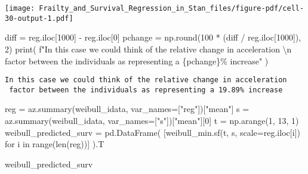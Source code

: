 \documentclass[
  letterpaper,
  DIV=11,
  numbers=noendperiod]{scrartcl}
\newenvironment{Shaded}{\begin{snugshade}}{\end{snugshade}}
\newcommand{\BuiltInTok}[1]{\textcolor[rgb]{0.00,0.23,0.31}{#1}}
\newcommand{\CharTok}[1]{\textcolor[rgb]{0.13,0.47,0.30}{#1}}
\newcommand{\ControlFlowTok}[1]{\textcolor[rgb]{0.00,0.23,0.31}{#1}}
\newcommand{\DecValTok}[1]{\textcolor[rgb]{0.68,0.00,0.00}{#1}}
\newcommand{\KeywordTok}[1]{\textcolor[rgb]{0.00,0.23,0.31}{#1}}
\newcommand{\NormalTok}[1]{\textcolor[rgb]{0.00,0.23,0.31}{#1}}
\newcommand{\OperatorTok}[1]{\textcolor[rgb]{0.37,0.37,0.37}{#1}}
\newcommand{\SpecialCharTok}[1]{\textcolor[rgb]{0.37,0.37,0.37}{#1}}
\newcommand{\SpecialStringTok}[1]{\textcolor[rgb]{0.13,0.47,0.30}{#1}}
\newcommand{\StringTok}[1]{\textcolor[rgb]{0.13,0.47,0.30}{#1}}
\begin{document}
\texttt{[image: Frailty\_and\_Survival\_Regression\_in\_Stan\_files/figure-pdf/cell-30-output-1.pdf]}

\begin{Shaded}
\begin{Highlighting}[]
\NormalTok{diff }\OperatorTok{=}\NormalTok{ reg.iloc[}\DecValTok{1000}\NormalTok{] }\OperatorTok{{-}}\NormalTok{ reg.iloc[}\DecValTok{0}\NormalTok{]}
\NormalTok{pchange }\OperatorTok{=}\NormalTok{ np.}\BuiltInTok{round}\NormalTok{(}\DecValTok{100} \OperatorTok{*}\NormalTok{ (diff }\OperatorTok{/}\NormalTok{ reg.iloc[}\DecValTok{1000}\NormalTok{]), }\DecValTok{2}\NormalTok{)}
\BuiltInTok{print}\NormalTok{(}
    \SpecialStringTok{f"In this case we could think of the relative change in acceleration }\CharTok{\textbackslash{}n}\SpecialStringTok{ factor between the individuals as representing a }\SpecialCharTok{\{}\NormalTok{pchange}\SpecialCharTok{\}}\SpecialStringTok{\% increase"}
\NormalTok{)}
\end{Highlighting}
\end{Shaded}

\begin{verbatim}
In this case we could think of the relative change in acceleration 
 factor between the individuals as representing a 19.89% increase
\end{verbatim}

\begin{Shaded}
\begin{Highlighting}[]
\NormalTok{reg }\OperatorTok{=}\NormalTok{ az.summary(weibull\_idata, var\_names}\OperatorTok{=}\NormalTok{[}\StringTok{"reg"}\NormalTok{])[}\StringTok{"mean"}\NormalTok{]}
\NormalTok{s }\OperatorTok{=}\NormalTok{ az.summary(weibull\_idata, var\_names}\OperatorTok{=}\NormalTok{[}\StringTok{"s"}\NormalTok{])[}\StringTok{"mean"}\NormalTok{][}\DecValTok{0}\NormalTok{]}
\NormalTok{t }\OperatorTok{=}\NormalTok{ np.arange(}\DecValTok{1}\NormalTok{, }\DecValTok{13}\NormalTok{, }\DecValTok{1}\NormalTok{)}
\NormalTok{weibull\_predicted\_surv }\OperatorTok{=}\NormalTok{ pd.DataFrame(}
\NormalTok{    [weibull\_min.sf(t, s, scale}\OperatorTok{=}\NormalTok{reg.iloc[i]) }\ControlFlowTok{for}\NormalTok{ i }\KeywordTok{in} \BuiltInTok{range}\NormalTok{(}\BuiltInTok{len}\NormalTok{(reg))]}
\NormalTok{).T}

\NormalTok{weibull\_predicted\_surv}
\end{Highlighting}
\end{Shaded}
\end{document}
